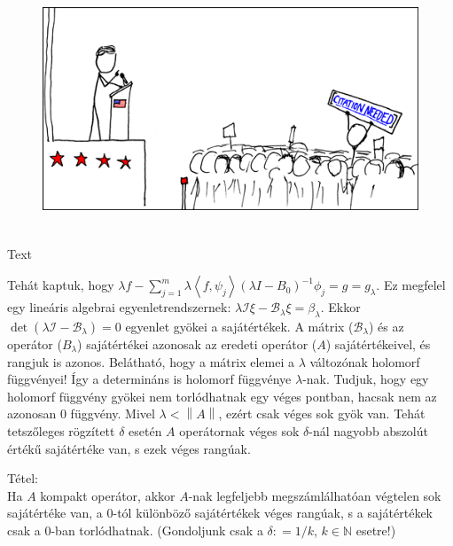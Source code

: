 \documentclass[12pt,a4paper]{scrartcl}
\newenvironment{tetel}{}{}
\newenvironment{ajanlofig}{\begin{figure}\begin{center}}{
\end{center}\end{figure}}
\begin{document}
\begin{ajanlo}

\begin{ajanlofig}

\href{https://xkcd.com}{\includegraphics[width=5.20833in,height=2.82292in]{wikipedian_protester.png}}

\end{ajanlofig}

Text

\end{ajanlo}

Tehát kaptuk, hogy
\(\lambda f - {\sum\limits_{j = 1}^{m}{\lambda\left\langle {f,\psi_{j}} \right\rangle\left( {\lambda I - B_{0}} \right)^{- 1}\phi_{j}}} = g = g_{\lambda}\).
Ez megfelel egy lineáris algebrai egyenletrendszernek:
\(\lambda\mathcal{I}\xi - \mathcal{B}_{\lambda}\xi = \beta_{\lambda}\).
Ekkor
\(\det\left( {\lambda\mathcal{I} - \mathcal{B}_{\lambda}} \right) = 0\)
egyenlet gyökei a sajátértékek. A mátrix (\(\mathcal{B}_{\lambda}\)) és
az operátor (\(B_{\lambda}\)) sajátértékei azonosak az eredeti operátor
(\(A\)) sajátértékeivel, és rangjuk is azonos. Belátható, hogy a mátrix
elemei a \(\lambda\) változónak holomorf függvényei! Így a determináns
is holomorf függvénye \(\lambda\)-nak. Tudjuk, hogy egy holomorf
függvény gyökei nem torlódhatnak egy véges pontban, hacsak nem az
azonosan 0 függvény. Mivel \(\lambda < \left\| A \right\|\), ezért csak
véges sok gyök van. Tehát tetszőleges rögzített \(\delta\) esetén \(A\)
operátornak véges sok \(\delta\)-nál nagyobb abszolút értékű sajátértéke
van, s ezek véges rangúak.

\begin{tetel}

Tétel:\\
Ha \(A\) kompakt operátor, akkor \(A\)-nak legfeljebb megszámlálhatóan
végtelen sok sajátértéke van, a 0-tól különböző sajátértékek véges
rangúak, s a sajátértékek csak a 0-ban torlódhatnak. (Gondoljunk csak a
\(\delta: = 1/k\), \(k \in {\mathbb{N}}\) esetre!)

\end{tetel}
\end{document}
